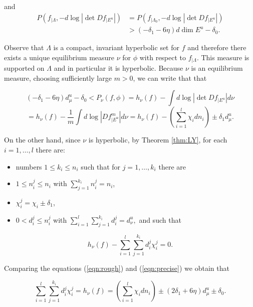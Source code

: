 \documentclass{amsart}
\theoremstyle{plain}
\theoremstyle{definition}
\theoremstyle{remark}
\numberwithin{equation}{section}
\begin{document}
and
\begin{align*}
 P(f_{|\Lambda},   - d   \log |  \det  Df_{| E^u}| )  &=  P(f_{|\Lambda_0},   - d   \log |  \det  Df_{| E^u}| ) \\
&>    (-\delta_1 - 6\eta) d \dim E^u - \delta_0.  
\end{align*}






Observe that $\Lambda$ is a compact, invariant hyperbolic set for $f$ and therefore there exists a unique equilibrium measure $\nu$ for $\phi$ with respect to $f_{| \Lambda}$.
This measure is supported on $\Lambda$ and in particular it is hyperbolic. Because $\nu$ is an equilibrium measure, choosing sufficiently large $m> 0$, we can write that that

\begin{equation}\label{eqn:rough}
    (-\delta_1 - 6\eta) d^u_{\mu} - \delta_0 < P_{\nu}(f,\phi) =  h_{\nu}(f)  -   \int d  \log |  \det  Df_{| E^u}| d\nu 
\end{equation}  
$$= h_{\nu}(f)  -  \frac{1}{m}\int d  \log |    Df^m_{| E^u}| d\nu  =  h_{\nu}(f) -  \left( \sum_{i=1}^l \chi_i d n_i  \right) \pm \delta_1 d^u_{\mu}.$$

On the other hand, since $\nu$ is hyperbolic, by Theorem \ref{thm:LY}, for each $i=1,\ldots, l$ there are:

\begin{itemize}
\item numbers $ 1 \leq k_i\leq n_i$ such that for $  j=1, \ldots, k_i  $ there are
\item $ 1\leq n_i^j\leq n_i$ with $\sum_{j=1}^{k_i}n_i^j = n_i$,
\item $\chi_i^j = \chi_i \pm \delta_1$,
\item $0 < d_i^{j} \leq n^j_i $ with $\sum_{i=1}^{l}\sum_{j=1}^{k_i} d_i^j = d^u_{\nu},$
 and such that
\end{itemize}


\begin{equation}\label{eqn:precise}
h_{\nu}(f) - \sum_{i=1}^l \sum_{j=1}^{k_i}   d_i^j \chi^j_i = 0.
\end{equation}

Comparing the equations (\ref{eqn:rough}) and (\ref{eqn:precise}) we obtain that

$$        \sum_{i=1}^l \sum_{j=1}^{k_i}   d_i^j \chi^j_i  =      h_{\nu}(f)   =   \left( \sum_{i=1}^l \chi_i d n_i  \right) \pm (2 \delta_1 + 6 \eta)d^u_{\mu} \pm \delta_0.      $$
\end{document}
